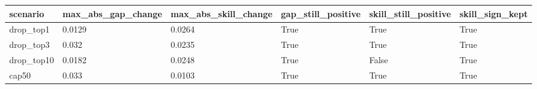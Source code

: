 \begin{tabular}{llllll}
\toprule
scenario & max\_abs\_gap\_change & max\_abs\_skill\_change & gap\_still\_positive & skill\_still\_positive & skill\_sign\_kept \\
\midrule
drop\_top1 & 0.0129 & 0.0264 & True & True & True \\
drop\_top3 & 0.032 & 0.0235 & True & True & True \\
drop\_top10 & 0.0182 & 0.0248 & True & False & True \\
cap50 & 0.033 & 0.0103 & True & True & True \\
\bottomrule
\end{tabular}